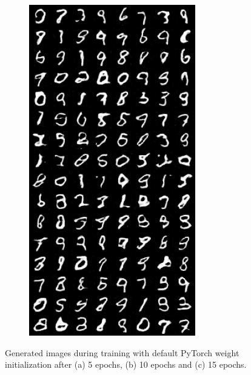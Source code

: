 \begin{figure}[H]
\begin{subfigure}{0.2\textwidth}
        \includegraphics[width=0.95\linewidth]{init/fake_sample_epoch_0015.png}
        \caption{}
        \label{subfig:init/fake_sample_epoch_0015}
    \end{subfigure}%

    \caption{Generated images during training with default PyTorch weight initialization after (a) 5 epochs, (b) 10 epochs and (c) 15 epochs.}
    \label{fig:init}
\end{figure}

